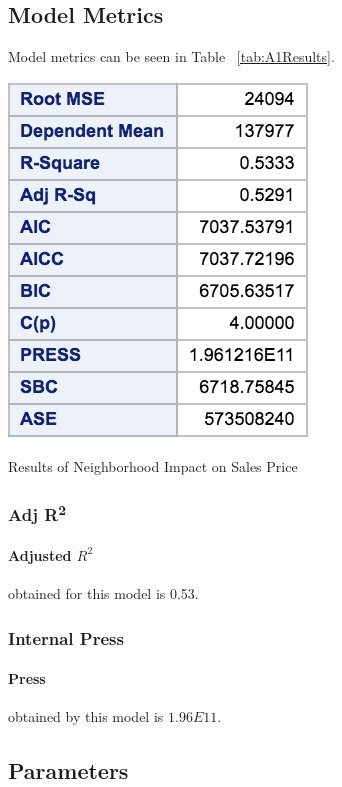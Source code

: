 \documentclass[11pt]{scrartcl} %
\begin{document}
\subsection{Model Metrics}
Model metrics can be seen in Table ~\ref{tab:A1Results}.
\begin{table}[h] %
	\centering %
	\includegraphics[scale=.4]{../graphics/A1NBMLRResults}
	\caption{Results of Neighborhood Impact on Sales Price}
	\label{tab:A1Results}
\end{table}
\subsubsection{Adj R\textsuperscript{2}} 
\paragraph{Adjusted $R^2$} obtained for this model is 0.53.
\subsubsection{Internal Press} 
\paragraph{Press} obtained by this model is $1.96E11$.

\subsection{Parameters}
\end{document}

